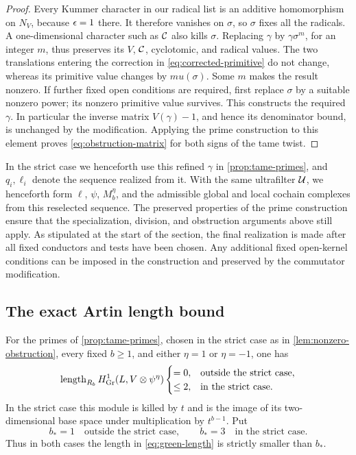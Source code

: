 \begin{proof}
Every Kummer character in our radical list is an additive
homomorphism on $N_V$, because $\epsilon=1$ there.  It therefore
vanishes on $\sigma$, so $\sigma$ fixes all the radicals.  A
one-dimensional character such as $\mathcal C$ also kills $\sigma$.
Replacing $\gamma$ by $\gamma\sigma^m$, for an integer $m$, thus
preserves its $V$, $\mathcal C$, cyclotomic, and radical values.  The two
translations entering the correction in
\cref{eq:corrected-primitive} do not change, whereas its primitive
value changes by $m u(\sigma)$.  Some $m$ makes the result nonzero.
If further fixed open conditions are required, first replace
$\sigma$ by a suitable nonzero power; its nonzero primitive value
survives.  This constructs the required $\gamma$.  In particular
the inverse matrix $V(\gamma)-1$, and hence its denominator bound,
is unchanged by the modification.  Applying the prime construction
to this element proves \cref{eq:obstruction-matrix} for both signs
of the tame twist.
\end{proof}

In the strict case we henceforth use this refined $\gamma$ in
\cref{prop:tame-primes}, and $q_i,\ell_i$ denote the sequence
realized from it.  With the same ultrafilter $\mathcal U$, we henceforth
form $\ell$, $\psi$, $M_b^\eta$, and the admissible global and local
cochain complexes from this reselected sequence.  The preserved
properties of the prime construction ensure that the specialization,
division, and obstruction arguments above still apply.
As stipulated at the start of the section, the
final realization is made after all fixed conductors and tests have
been chosen.  Any additional fixed open-kernel conditions can be imposed
in the construction and preserved by the commutator modification.

\subsection{The exact Artin length bound}

\begin{proposition}\label{prop:green-length}
For the primes of \cref{prop:tame-primes}, chosen in the strict case
as in \cref{lem:nonzero-obstruction}, every fixed $b\ge1$, and
either $\eta=1$ or $\eta=-1$, one has
\begin{equation}\label{eq:green-length}
 \operatorname{length}_{R_b}H^1_{\mathrm{Gr}}(L,V\otimes\psi^{\eta})
 \begin{cases}
 =0,&\text{outside the strict case},\\
 \le2,&\text{in the strict case}.
 \end{cases}
\end{equation}
In the strict case this module is killed by $t$ and is the image
of its two-dimensional base space under multiplication by
$t^{b-1}$.  Put
\begin{equation}\label{eq:b-star}
 b_*=1\quad\text{outside the strict case},\qquad
 b_*=3\quad\text{in the strict case}.
\end{equation}
Thus in both cases the length in \cref{eq:green-length} is
strictly smaller than $b_*$.
\end{proposition}

